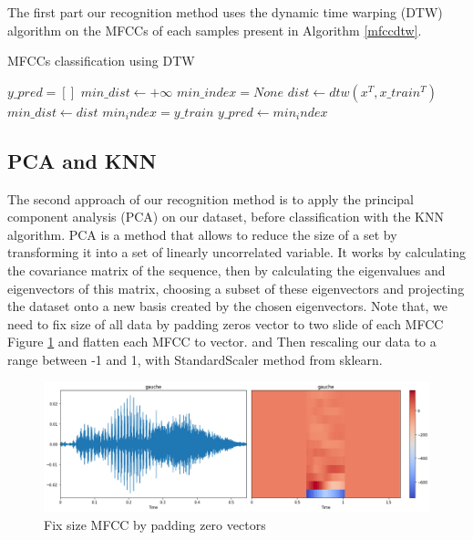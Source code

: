 \documentclass[%
  article,%
  10pt,%
  a4paper,%
  fleqn,%
  oneside,%
  sumario = tradicional,%
  chapter = TITLE,%
  section = TITLE,%
]{abntex2}
\begin{document}
The first part our recognition method uses the dynamic time warping (DTW) algorithm on the MFCCs of each samples present in Algorithm \ref{mfccdtw}.

\begin{algorithm}
  \caption{MFCCs classification using DTW}\label{mfccdtw}
  \begin{algorithmic}
    \State $y\_pred = []$
    	\State $min\_dist \gets +\infty$
	\State $min\_index = None$
   		 \State $dist \gets dtw(x^T, x\_train^T)$
    			\State $min\_dist \gets dist$
			\State $min_index = y\_train$
    		\EndIf
    	\EndFor
	\State $y\_pred \gets min_index$
    \EndFor
  \end{algorithmic}
\end{algorithm}

\subsection{PCA and KNN}
The second approach of our recognition method is to apply the principal component analysis (PCA) on our dataset, before classification with the KNN algorithm. PCA is a method that allows to reduce the size of a set by transforming it into a set of linearly uncorrelated variable. It works by calculating the covariance matrix of the sequence, then by calculating the eigenvalues and eigenvectors of this matrix, choosing a subset of these eigenvectors and projecting the dataset onto a new basis created by the chosen eigenvectors\cite{8538414}. Note that, we need to fix size of all data by padding zeros vector to two slide of each MFCC Figure \ref{fig:mfccpadding} and flatten each MFCC to vector. and Then rescaling our data to a range between -1 and 1, with StandardScaler method from sklearn. 

\begin{figure}[H]
  \centering
  \includegraphics[width = 0.8\columnwidth]{./Figuras/mfccpadding}
  \caption{Fix size MFCC by padding zero vectors}
  \label{fig:mfccpadding}
\end{figure}
\end{document}
